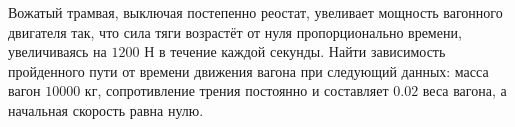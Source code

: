 Вожатый трамвая, выключая постепенно реостат, увеливает
мощность вагонного двигателя так, что сила тяги возрастёт от нуля
пропорционально времени, увеличиваясь на $1200$ Н в течение каждой
секунды. Найти зависимость пройденного пути от времени движения вагона
при следующий данных: масса вагон $10 000$ кг, сопротивление трения
постоянно и составляет $0.02$ веса вагона, а начальная скорость
равна нулю.
